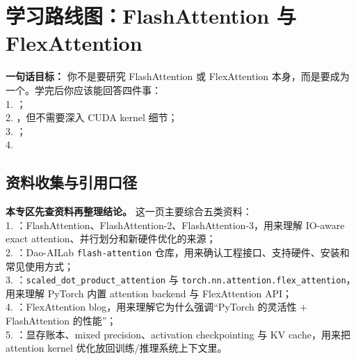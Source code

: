 
\section{学习路线图：FlashAttention 与 FlexAttention}

\begin{conceptbox}
\textbf{一句话目标：} 你不是要研究 FlashAttention 或 FlexAttention 本身，而是要成为一个。学完后你应该能回答四件事：\\
1. ；\\
2. ，但不需要深入 CUDA kernel 细节；\\
3. ；\\
4. 
\end{conceptbox}

\subsection*{资料收集与引用口径}

\begin{conceptbox}
\textbf{本专区先查资料再整理结论。} 这一页主要综合五类资料：\\
1. ：FlashAttention、FlashAttention-2、FlashAttention-3，用来理解 IO-aware exact attention、并行划分和新硬件优化的来源；\\
2. ：Dao-AILab \texttt{flash-attention} 仓库，用来确认工程接口、支持硬件、安装和常见使用方式；\\
3. ：\texttt{scaled\_dot\_product\_attention} 与 \texttt{torch.nn.attention.flex\_attention}，用来理解 PyTorch 内置 attention backend 与 FlexAttention API；\\
4. ：FlexAttention blog，用来理解它为什么强调“PyTorch 的灵活性 + FlashAttention 的性能”；\\
5. ：显存账本、mixed precision、activation checkpointing 与 KV cache，用来把 attention kernel 优化放回训练/推理系统上下文里。
\end{conceptbox}

